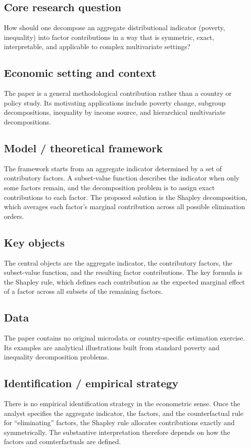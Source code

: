 \documentclass[11pt,a4paper]{article}
\begin{document}
\subsection*{Core research question}
How should one decompose an aggregate distributional indicator (poverty, inequality) into factor contributions in a way that is symmetric, exact, interpretable, and applicable to complex multivariate settings?

\subsection*{Economic setting and context}
The paper is a general methodological contribution rather than a country or policy study. Its motivating applications include poverty change, subgroup decompositions, inequality by income source, and hierarchical multivariate decompositions.

\subsection*{Model / theoretical framework}
The framework starts from an aggregate indicator determined by a set of contributory factors. A subset-value function describes the indicator when only some factors remain, and the decomposition problem is to assign exact contributions to each factor. The proposed solution is the Shapley decomposition, which averages each factor’s marginal contribution across all possible elimination orders.

\subsection*{Key objects}
The central objects are the aggregate indicator, the contributory factors, the subset-value function, and the resulting factor contributions. The key formula is the Shapley rule, which defines each contribution as the expected marginal effect of a factor across all subsets of the remaining factors.

\subsection*{Data}
The paper contains no original microdata or country-specific estimation exercise. Its examples are analytical illustrations built from standard poverty and inequality decomposition problems.

\subsection*{Identification / empirical strategy}
There is no empirical identification strategy in the econometric sense. Once the analyst specifies the aggregate indicator, the factors, and the counterfactual rule for “eliminating” factors, the Shapley rule allocates contributions exactly and symmetrically. The substantive interpretation therefore depends on how the factors and counterfactuals are defined.
\end{document}
